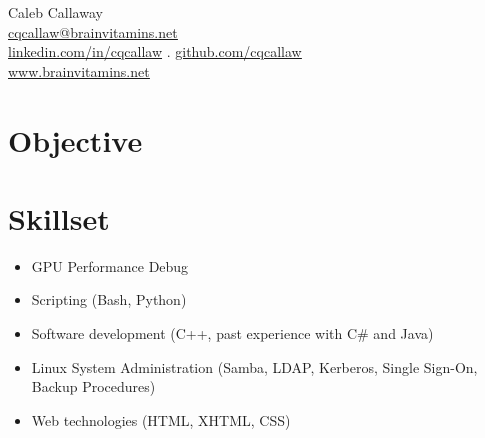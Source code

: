 \documentclass{article}
\begin{document}
	\begin{center}
		{\Large Caleb Callaway}\\
		\href{mailto:cqcallaw@brainvitamins.net}{\ul{cqcallaw@brainvitamins.net}}\\
		\href{http://linkedin.com/in/cqcallaw/}{\ul{linkedin.com/in/cqcallaw}} . \href{https://github.com/cqcallaw/}{\ul{github.com/cqcallaw}}\\
		\href{https://www.brainvitamins.net/}{\ul{www.brainvitamins.net}}
	\end{center}

	\section*{Objective}

	\section*{Skillset}
	\begin{itemize}[label={}]
		\item GPU Performance Debug
		\item Scripting (Bash, Python)
		\item Software development (C++, past experience with C\# and Java)
		\item Linux System Administration (Samba, LDAP, Kerberos, Single Sign-On, Backup Procedures)
		\item Web technologies (HTML, XHTML, CSS)
	\end{itemize}
\end{document}
